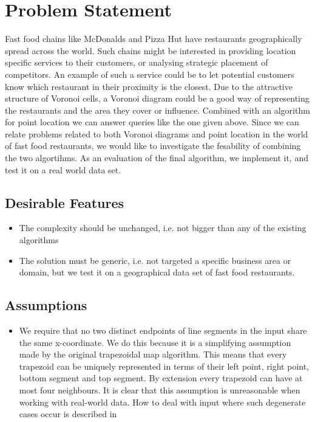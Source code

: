 \section{Problem Statement}
Fast food chains like McDonalds and Pizza Hut have restaurants geographically spread across the world. Such chains might be interested in providing location specific services to their customers, or analysing strategic placement of competitors. An example of such a service could be to let potential customers know which restaurant in their proximity is the closest. Due to the attractive structure of Voronoi cells, a Voronoi diagram could be a good way of representing the restaurants and the area they cover or influence. Combined with an algorithm for point location we can answer queries like the one given above.
Since we can relate problems related to both Voronoi diagrams and point location in the world of fast food restaurants, we would like to investigate the fesability of combining the two algortihms. As an evaluation of the final algorithm, we implement it, and test it on a real world data set.

\subsection{Desirable Features}
\label{desirable_features}

\begin{itemize}
  \item The complexity should be unchanged, i.e. not bigger than any of the existing algorithms
  \item The solution must be generic, i.e. not targeted a specific business area or domain, but we test it on a geographical data set of fast food restaurants. 
\end{itemize}

\subsection{Assumptions}
\label{assumptions}

\begin{itemize}
  \item We require that no two distinct endpoints of line segments in the input share the same x-coordinate. We do this because it is a simplifying assumption made by the original trapezoidal map algorithm. This means that every trapezoid can be uniquely represented in terms of their left point, right point, bottom segment and top segment. By extension every trapezoid can have at most four neighbours. It is clear that this assumption is unreasonable when working with real-world data. How to deal with input where such degenerate cases occur is described in \cite{computational_geometry}
\end{itemize}





